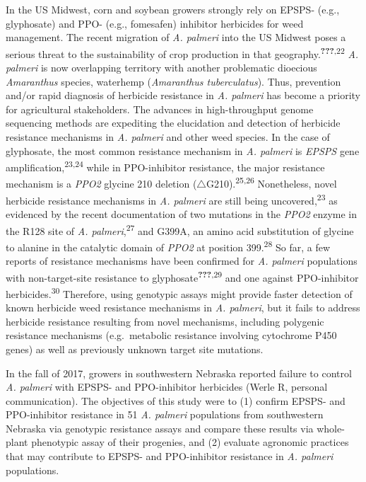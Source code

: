 \documentclass[
  12pt,
  a4paper]{article}
\begin{document}
In the US Midwest, corn and soybean growers strongly rely on EPSPS-
(e.g., glyphosate) and PPO- (e.g., fomesafen) inhibitor herbicides for
weed management. The recent migration of \emph{A. palmeri} into the US
Midwest poses a serious threat to the sustainability of crop production
in that geography.\textsuperscript{{\textbf{???}},22} \emph{A. palmeri}
is now overlapping territory with another problematic dioecious
\emph{Amaranthus} species, waterhemp (\emph{Amaranthus tuberculatus}).
Thus, prevention and/or rapid diagnosis of herbicide resistance in
\emph{A. palmeri} has become a priority for agricultural stakeholders.
The advances in high-throughput genome sequencing methods are expediting
the elucidation and detection of herbicide resistance mechanisms in
\emph{A. palmeri} and other weed species. In the case of glyphosate, the
most common resistance mechanism in \emph{A. palmeri} is \emph{EPSPS}
gene amplification,\textsuperscript{23,24} while in PPO-inhibitor
resistance, the major resistance mechanism is a \emph{PPO2} glycine 210
deletion (\(\triangle\)G210).\textsuperscript{25,26} Nonetheless, novel
herbicide resistance mechanisms in \emph{A. palmeri} are still being
uncovered,\textsuperscript{23} as evidenced by the recent documentation
of two mutations in the \emph{PPO2} enzyme in the R128 site of \emph{A.
palmeri},\textsuperscript{27} and G399A, an amino acid substitution of
glycine to alanine in the catalytic domain of \emph{PPO2} at position
399.\textsuperscript{28} So far, a few reports of resistance mechanisms
have been confirmed for \emph{A. palmeri} populations with
non-target-site resistance to
glyphosate\textsuperscript{{\textbf{???}},29} and one against
PPO-inhibitor herbicides.\textsuperscript{30} Therefore, using genotypic
assays might provide faster detection of known herbicide weed resistance
mechanisms in \emph{A. palmeri}, but it fails to address herbicide
resistance resulting from novel mechanisms, including polygenic
resistance mechanisms (e.g.~metabolic resistance involving cytochrome
P450 genes) as well as previously unknown target site mutations.

In the fall of 2017, growers in southwestern Nebraska reported failure
to control \emph{A. palmeri} with EPSPS- and PPO-inhibitor herbicides
(Werle R, personal communication). The objectives of this study were to
(1) confirm EPSPS- and PPO-inhibitor resistance in 51 \emph{A. palmeri}
populations from southwestern Nebraska via genotypic resistance assays
and compare these results via whole-plant phenotypic assay of their
progenies, and (2) evaluate agronomic practices that may contribute to
EPSPS- and PPO-inhibitor resistance in \emph{A. palmeri} populations.
\end{document}
